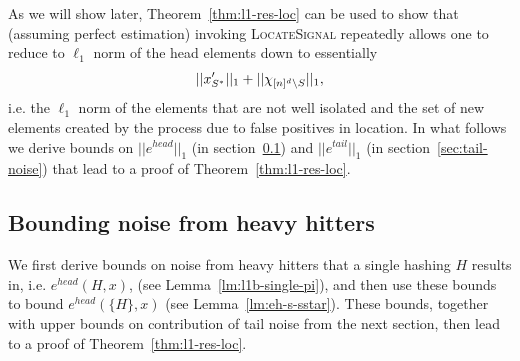 As we will show later, Theorem~\ref{thm:l1-res-loc} can be used to show that (assuming perfect estimation) invoking \textsc{LocateSignal} repeatedly allows one to reduce to $\ell_1$ norm of the head elements down to essentially
$$
||x'_{S^*}||_1+||\chi_{{[n]^d}\setminus S}||_1,
$$
i.e. the $\ell_1$ norm of the elements that are not well isolated and the set of new elements created by the process due to false positives in location. 
In what follows we derive bounds on $||e^{head}||_1$ (in section~\ref{sec:h-noise}) and $||e^{tail}||_1$ (in section~\ref{sec:tail-noise}) that lead to a proof of Theorem~\ref{thm:l1-res-loc}.

\subsection{Bounding noise from heavy hitters}\label{sec:h-noise}

We first derive bounds on noise from heavy hitters that a single hashing $H$ results in, i.e. $e^{head}(H, x)$,  (see Lemma~\ref{lm:l1b-single-pi}), and then use these bounds to bound $e^{head}(\{H\}, x)$ (see Lemma~\ref{lm:eh-s-sstar}). These bounds, together with upper bounds on contribution of tail noise from the next section, then lead to a proof of Theorem~\ref{thm:l1-res-loc}.

